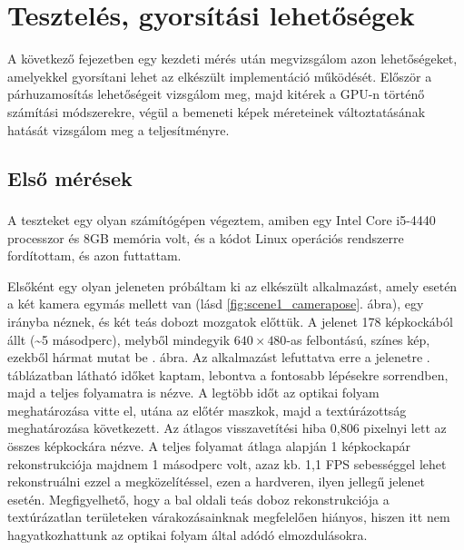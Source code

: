 \chapter{Tesztelés, gyorsítási lehetőségek}

A következő fejezetben egy kezdeti mérés után megvizsgálom azon lehetőségeket, amelyekkel gyorsítani lehet az elkészült implementáció működését. Először a párhuzamosítás lehetőségeit vizsgálom meg, majd kitérek a GPU-n történő számítási módszerekre, végül a bemeneti képek méreteinek változtatásának hatását vizsgálom meg a teljesítményre.

\section{Első mérések}

A teszteket egy olyan számítógépen végeztem, amiben egy Intel\textsuperscript{\textregistered} Core\texttrademark{} i5-4440 processzor és 8GB memória volt, és a kódot Linux operációs rendszerre fordítottam, és azon futtattam.

Elsőként egy olyan jeleneten próbáltam ki az elkészült alkalmazást, amely esetén a két kamera egymás mellett van (lásd \ref{fig:scene1_camerapose}. ábra), egy irányba néznek, és két teás dobozt mozgatok előttük. A jelenet 178 képkockából állt (\textasciitilde 5 másodperc), melyből mindegyik $640\times 480$-as felbontású, színes kép, ezekből hármat mutat be . ábra. Az alkalmazást lefuttatva erre a jelenetre . táblázatban látható időket kaptam, lebontva a fontosabb lépésekre sorrendben, majd a teljes folyamatra is nézve. A legtöbb időt az optikai folyam meghatározása vitte el, utána az előtér maszkok, majd a textúrázottság meghatározása következett. Az átlagos visszavetítési hiba 0,806 pixelnyi lett az összes képkockára nézve. A teljes folyamat átlaga alapján 1 képkockapár rekonstrukciója majdnem 1 másodperc volt, azaz kb. 1,1 FPS sebességgel lehet rekonstruálni ezzel a megközelítéssel, ezen a hardveren, ilyen jellegű jelenet esetén. Megfigyelhető, hogy a bal oldali teás doboz rekonstrukciója a textúrázatlan területeken várakozásainknak megfelelően hiányos, hiszen itt nem hagyatkozhattunk az optikai folyam által adódó elmozdulásokra.

